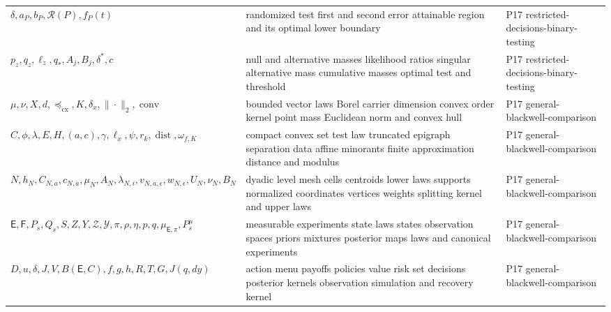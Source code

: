 \begin{longtable}{@{}p{}p{}p{}@{}}
\(\delta,\allowbreak a_P,\allowbreak b_P,\allowbreak \mathcal R(P),\allowbreak f_P(t)\) & randomized test first and second error attainable region and its optimal lower boundary & P17 restricted-\allowbreak{}decisions-\allowbreak{}binary-\allowbreak{}testing \\
\(p_z,\allowbreak q_z,\allowbreak \ell_z,\allowbreak q_*,\allowbreak A_j,\allowbreak B_j,\allowbreak \delta^*,\allowbreak c\) & null and alternative masses likelihood ratios singular alternative mass cumulative masses optimal test and threshold & P17 restricted-\allowbreak{}decisions-\allowbreak{}binary-\allowbreak{}testing \\
\(\mu,\allowbreak \nu,\allowbreak X,\allowbreak d,\allowbreak \preceq_{\mathrm{cx}},\allowbreak K,\allowbreak \delta_x,\allowbreak \|\cdot\|_2,\allowbreak \operatorname{conv}\) & bounded vector laws Borel carrier dimension convex order kernel point mass Euclidean norm and convex hull & P17 general-\allowbreak{}blackwell-\allowbreak{}comparison \\
\(C,\allowbreak \phi,\allowbreak \lambda,\allowbreak E,\allowbreak H,\allowbreak (a,\allowbreak c),\allowbreak \gamma,\allowbreak \ell_x,\allowbreak \psi,\allowbreak r_k,\allowbreak \operatorname{dist},\allowbreak \omega_{f,K}\) & compact convex set test law truncated epigraph separation data affine minorants finite approximation distance and modulus & P17 general-\allowbreak{}blackwell-\allowbreak{}comparison \\
\(N,\allowbreak h_N,\allowbreak C_{N,a},\allowbreak c_{N,a},\allowbreak \mu_N,\allowbreak A_N,\allowbreak \lambda_{N,i},\allowbreak v_{N,a,\epsilon},\allowbreak w_{N,\epsilon},\allowbreak U_N,\allowbreak \nu_N,\allowbreak B_N\) & dyadic level mesh cells centroids lower laws supports normalized coordinates vertices weights splitting kernel and upper laws & P17 general-\allowbreak{}blackwell-\allowbreak{}comparison \\
\(\mathsf E,\allowbreak \mathsf F,\allowbreak P_s,\allowbreak Q_s,\allowbreak S,\allowbreak Z,\allowbreak Y,\allowbreak \mathcal Z,\allowbreak \mathcal Y,\allowbreak \pi,\allowbreak \rho,\allowbreak \eta,\allowbreak p,\allowbreak q,\allowbreak \mu_{\mathsf E,\pi},\allowbreak P_s^\mu\) & measurable experiments state laws states observation spaces priors mixtures posterior maps laws and canonical experiments & P17 general-\allowbreak{}blackwell-\allowbreak{}comparison \\
\(D,\allowbreak u,\allowbreak \delta,\allowbreak J,\allowbreak V,\allowbreak B(\mathsf E,\allowbreak C),\allowbreak f,\allowbreak g,\allowbreak h,\allowbreak R,\allowbreak T,\allowbreak G,\allowbreak J(q,\allowbreak dy)\) & action menu payoffs policies value risk set decisions posterior kernels observation simulation and recovery kernel & P17 general-\allowbreak{}blackwell-\allowbreak{}comparison \\

\end{longtable}
